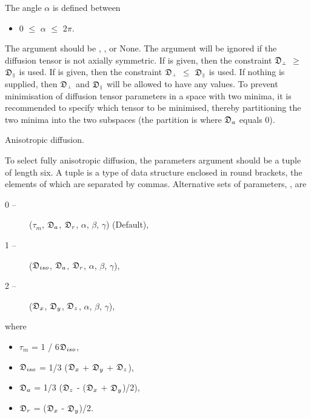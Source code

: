The angle $\alpha$ is defined between


\begin{itemize}
\item[] 0 $\le$ $\alpha$ $\le$ 2$\pi$. 
\end{itemize}


The  argument should be , , or None.  The argument will be ignored if the diffusion tensor is not axially symmetric.  If  is given, then the constraint $\mathfrak{D}_{\scriptscriptstyle \perp}$ $\ge$ $\mathfrak{D}_{\scriptscriptstyle \parallel}$ is used.  If  is given, then the constraint $\mathfrak{D}_{\scriptscriptstyle \perp}$ $\le$ $\mathfrak{D}_{\scriptscriptstyle \parallel}$ is used.  If nothing is supplied, then $\mathfrak{D}_{\scriptscriptstyle \perp}$ and $\mathfrak{D}_{\scriptscriptstyle \parallel}$ will be allowed to have any values.  To prevent minimisation of diffusion tensor parameters in a space with two minima, it is recommended to specify which tensor to be minimised, thereby partitioning the two minima into the two subspaces (the partition is where $\mathfrak{D}_a$ equals 0).


Anisotropic diffusion.


To select fully anisotropic diffusion, the parameters argument should be a tuple of length six.  A tuple is a type of data structure enclosed in round brackets, the elements of which are separated by commas.  Alternative sets of parameters, , are


\begin{description}
\item[0 --]  ($\tau_m$, $\mathfrak{D}_a$, $\mathfrak{D}_r$, $\alpha$, $\beta$, $\gamma$)   (Default), 
\item[1 --]  ($\mathfrak{D}_{iso}$, $\mathfrak{D}_a$, $\mathfrak{D}_r$, $\alpha$, $\beta$, $\gamma$), 
\item[2 --]  ($\mathfrak{D}_x$, $\mathfrak{D}_y$, $\mathfrak{D}_z$, $\alpha$, $\beta$, $\gamma$), 
\end{description}


where


\begin{itemize}
\item[] $\tau_m$ = 1 / 6$\mathfrak{D}_{iso}$, 
\item[] $\mathfrak{D}_{iso}$ = 1/3 ($\mathfrak{D}_x$ + $\mathfrak{D}_y$ + $\mathfrak{D}_z$), 
\item[] $\mathfrak{D}_a$ = 1/3 ($\mathfrak{D}_z$ - ($\mathfrak{D}_x$ + $\mathfrak{D}_y$)/2), 
\item[] $\mathfrak{D}_r$ = ($\mathfrak{D}_x$ - $\mathfrak{D}_y$)/2. 
\end{itemize}



